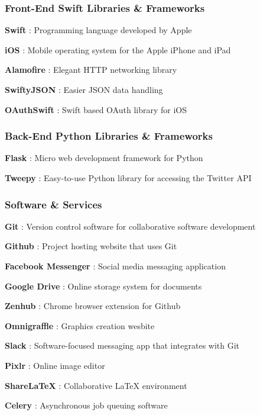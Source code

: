 \documentclass{article}
\begin{document}
\subsubsection*{Front-End Swift Libraries \& Frameworks}
\begin{itemize*}
    \item \textbf{Swift} \cite{swift}: Programming language developed by Apple
    \item \textbf{iOS} \cite{ios}: Mobile operating system for the Apple iPhone and iPad
    \item \textbf{Alamofire} \cite{alamofire}: Elegant HTTP networking library
    \item \textbf{SwiftyJSON} \cite{swiftyjson}: Easier JSON data handling
    \item \textbf{OAuthSwift} \cite{oauthswift}: Swift based OAuth library for iOS
\end{itemize*}

\subsubsection*{Back-End Python Libraries \& Frameworks}
\begin{itemize*}
    \item \textbf{Flask} \cite{flask}: Micro web development framework for Python
    \item \textbf{Tweepy} \cite{tweepy}: Easy-to-use Python library for accessing the Twitter API
\end{itemize*}

\subsubsection*{Software \& Services}
\begin{itemize*}
     \item \textbf{Git} \cite{git}: Version control software for collaborative software development
     \item \textbf{Github} \cite{github}: Project hosting website that uses Git
     \item \textbf{Facebook Messenger} \cite{messenger}: Social media messaging application
     \item \textbf{Google Drive} \cite{drive}: Online storage system for documents
     \item \textbf{Zenhub} \cite{zenhub}: Chrome browser extension for Github
     \item \textbf{Omnigraffle} \cite{omnigraffle}: Graphics creation wesbite
     \item \textbf{Slack} \cite{slack}: Software-focused messaging app that integrates with Git
     \item \textbf{Pixlr} \cite{pixlr}: Online image editor
     \item \textbf{ShareLaTeX} \cite{sharelatex}: Collaborative LaTeX environment
     \item \textbf{Celery} \cite{celery}: Asynchronous job queuing software
\end{itemize*}
\end{document}
